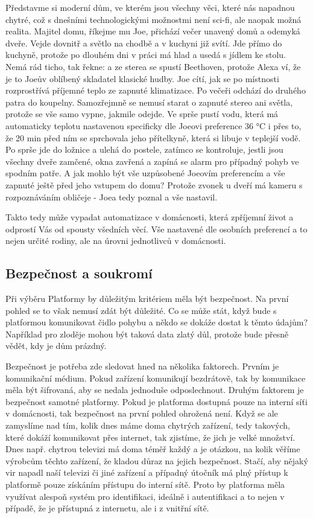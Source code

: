 Představme si moderní dům, ve kterém jsou všechny věci, které nás napadnou chytré, což s dnešními technologickými možnostmi není sci-fi, ale naopak možná realita. Majitel domu, říkejme mu Joe, přichází večer unavený domů a odemyká dveře. Vejde dovnitř a světlo na chodbě a v kuchyni již svítí. Jde přímo do kuchyně, protože po dlouhém dni v práci má hlad a usedá s jídlem ke stolu. Nemá rád ticho, tak řekne:  a ze sterea se spustí Beethoven, protože Alexa ví, že je to Joeův oblíbený skladatel klasické hudby. Joe cítí, jak se po místnosti rozprostřívá příjemné teplo ze zapnuté klimatizace. Po večeři odchází do druhého patra do koupelny. Samozřejmně se nemusí starat o zapnuté stereo ani světla, protože se vše samo vypne, jakmile odejde. Ve sprše pustí vodu, která má automaticky teplotu nastavenou specificky dle Joeovi preference 36 °C i přes to, že 20 min před ním se sprchovala jeho přítelkyně, která si libuje v teplejší vodě. Po sprše jde do ložnice a ulehá do postele, zatímco se kontroluje, jestli jsou všechny dveře zamčené, okna zavřená a zapíná se alarm pro případný pohyb ve spodním patře. A jak mohlo být vše uzpůsobené Joeovím preferencím a vše zapnuté ještě před jeho vstupem do domu? Protože zvonek u dveří má kameru s rozpoznáváním obličeje - Joea tedy poznal a vše nastavil.

Takto tedy může vypadat automatizace v domácnosti, která zpříjemní život a odprostí Vás od spousty všedních věcí. Vše nastavené dle osobních preferencí a to nejen určité rodiny, ale na úrovni jednotlivců v domácnosti.


\subsection{Bezpečnost a soukromí}
Při výběru Platformy by důležitým kritériem měla být bezpečnost. Na první pohled se to však nemusí zdát být důležité. Co se může stát, když bude s platformou komunikovat čidlo pohybu a někdo se dokáže dostat k těmto údajům? Například pro zloděje mohou být taková data zlatý důl, protože bude přesně vědět, kdy je dům prázdný.

Bezpečnost je potřeba zde sledovat hned na několika faktorech. Prvním je komunikační médium. Pokud zařízení komunikují bezdrátově, tak by komunikace měla být šifrovaná, aby se nedala jednoduše odposlechnout. Druhým faktorem je bezpečnost samotné platformy. Pokud je platforma dostupná pouze na interní síťi v domácnosti, tak bezpečnost na první pohled ohrožená není. Když se ale zamyslíme nad tím, kolik dnes máme doma chytrých zařízení, tedy takových, které dokáží komunikovat přes internet, tak zjistíme, že jich je velké množství. Dnes např. chytrou televizi má doma téměř každý a je otázkou, na kolik věříme výrobcům těchto zařízení, že kladou důraz na jejich bezpečnost. Stačí, aby nějaký vir napadl naší televizi či jiné zařízení a případný útočník má plný přístup k platformě pouze získáním přístupu do interní sítě. Proto by platforma měla využívat alespoň systém pro identifikaci, ideálně i autentifikaci a to nejen v případě, že je přístupná z internetu, ale i z vnitřní sítě.

